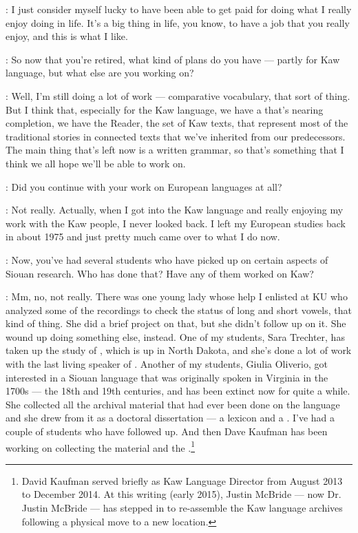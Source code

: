 \documentclass[output=paper]{LSP/langsci}
\begin{document}
: I just consider myself lucky to have been able to get paid for doing what I really enjoy doing in life. It's a big thing in life, you know, to have a job that you really enjoy, and this is what I like.

: So now that you're retired, what kind of plans do you have --- partly for Kaw language, but what else are you working on?

: Well, I'm still doing a lot of work --- comparative vocabulary, that sort of thing. But I think that, especially for the Kaw language, we have a  that's nearing completion, we have the Reader, the set of Kaw texts, that represent most of the traditional stories in connected texts that we've inherited from our predecessors. The main thing that's left now is a written grammar, so that's something that I think we all hope we'll be able to work on.

: Did you continue with your work on European languages at all?

: Not really. Actually, when I got into the Kaw language and really enjoying my work with the Kaw people, I never looked back. I left my European studies back in about 1975 and just pretty much came over to what I do now.

: Now, you've had several students who have picked up on certain aspects of Siouan research. Who has done that? Have any of them worked on Kaw?

: Mm, no, not really. There was one young lady whose help I enlisted at KU who analyzed some of the recordings to check the status of long and short vowels, that kind of thing. She did a brief project on that, but she didn't follow up on it. She wound up doing something else, instead. One of my students, Sara Trechter, has taken up the study of , which is up in North Dakota, and she's done a lot of work with the last living speaker of . Another of my students, Giulia Oliverio, got interested in a Siouan language that was originally spoken in Virginia in the 1700s --- the 18th and 19th centuries, and has been extinct now for quite a while. She collected all the archival material that had ever been done on the  language and she drew from it as a doctoral dissertation --- a lexicon and a . I've had a couple of students who have followed up. And then Dave Kaufman has been working on collecting the  material and the  .\footnote{David Kaufman served briefly as Kaw Language Director from August 2013 to December 2014. At this writing (early 2015), Justin McBride --- now Dr. Justin McBride --- has stepped in to re-assemble the Kaw language archives following a physical move to a new location.}
\end{document}
